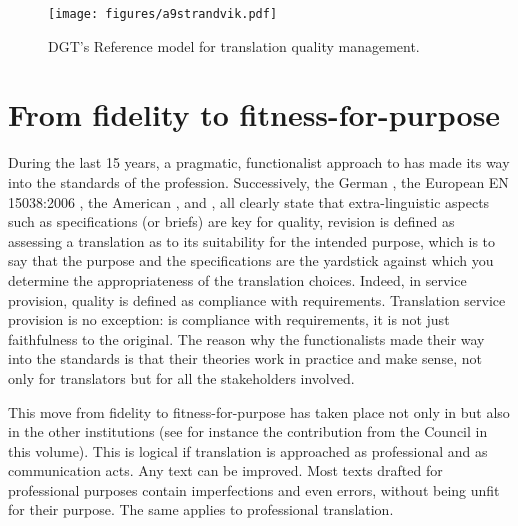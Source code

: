 \documentclass[output=paper]{langsci/langscibook}
\begin{document}
\begin{figure}
\caption{DGT's Reference model for translation quality management.}
\label{fig:strandvik}
\texttt{[image: figures/a9strandvik.pdf]}
\end{figure}
 

\section{From fidelity to fitness-for-purpose}\label{sec:strandvik:strandvic:5}

During the last 15 years, a pragmatic, functionalist approach to  has made its way into the standards of the profession. Successively, the German \citeauthor{DIN1998},  the European EN 15038:2006 \nocite{EN2006}, the American \citeauthor{ASTM2014}, and \citeauthor{ISO2012}, \citeauthor{ISO2015} all clearly state that extra-linguistic aspects such as specifications (or briefs) are key for quality, revision is defined as assessing a translation as to its suitability for the intended purpose, which is to say that the purpose and the specifications are the yardstick against which you determine the appropriateness of the translation choices. Indeed, in service provision, quality is defined as compliance with requirements. Translation service provision is no exception:  is compliance with requirements, it is not just faithfulness to the original. The reason why the functionalists made their way into the standards is that their theories work in practice and make sense, not only for translators but for all the stakeholders involved.

This move from fidelity to fitness-for-purpose has taken place not only in  but also in the other  institutions (see for instance the contribution from the Council in this volume). This is logical if translation is approached as professional  and as communication acts. Any text can be improved. Most texts drafted for professional purposes contain imperfections and even errors, without being unfit for their purpose. The same applies to professional translation. 
\end{document}
